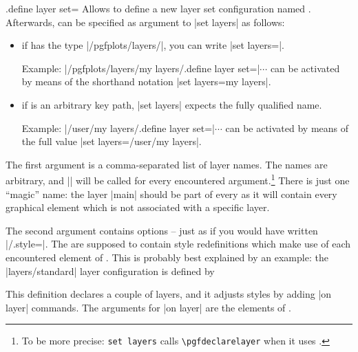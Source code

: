 \begin{handler}{{.define layer set}=}
    Allows to define a new layer set configuration named .
    Afterwards,  can be specified as argument to |set layers| as follows:
	\begin{itemize}
		\item if  has the type |/pgfplots/layers/|, you can write |set layers=|.

		Example: |/pgfplots/layers/my layers/.define layer set=|$\cdots$ can be activated by means of the shorthand notation |set layers=my layers|.

		\item if  is an arbitrary key path, |set layers| expects the fully qualified  name. 
		
		Example: |/user/my layers/.define layer set=|$\cdots$ can be activated by means of the full value |set layers=/user/my layers|.
	\end{itemize}

    The first argument  is a comma-separated list of
    layer names. The names are arbitrary, and |\pgfdeclarelayer| will be called
    for every encountered argument.\footnote{To be more precise: \texttt{set
    layers} calls \texttt{\textbackslash pgfdeclarelayer} when it uses
    .} There is just one ``magic'' name: the layer
    |main| should be part of every  as it will
    contain every graphical element which is not associated with a specific
    layer.

    The second argument  contains options -- just as if
    you would have written |/.style=|. The
     are supposed to contain \PGFPlots{} style
    redefinitions which make use of each encountered element of . This is probably best explained by an example: the
    |layers/standard| layer configuration is defined by
\begin{codeexample}
\end{codeexample}
    \noindent This definition declares a couple of layers, and it adjusts
    \PGFPlots{} styles by adding |on layer| commands. The arguments for
    |on layer| are the elements of .


\end{handler}
